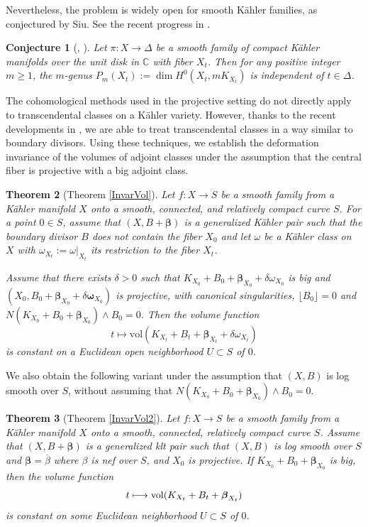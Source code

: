 \documentclass[12pt]{amsart}
\numberwithin{equation}{section}
\newtheorem{theorem} {Theorem} [section]
\theoremstyle{definition}
\theoremstyle{plain}
\newtheorem{conjecture}  [theorem]     {Conjecture}
\newtheorem*{thm A*}{Theorem A}
\newtheorem*{thm B*}{Theorem B}
\newtheorem*{thm C*}{Theorem C}
\newtheorem*{thm D*}{Theorem D}
\theoremstyle{definition}
\renewcommand{\1}{\mathds{1}}
\newcommand{\bbeta}{\boldsymbol{\beta}}
\renewcommand{\>}{\rightarrow}
\begin{document}
Nevertheless, the problem is widely open for smooth K\"ahler families, as conjectured by Siu. See the recent progress in \cite{CP23Pluri}. 
\begin{conjecture}[{\cite[Conjecture 0.4]{Siu02}, \cite[Conjecture 1.4]{CP23Pluri}}]\label{SiuConj}
Let $\pi: X \rightarrow \Delta$ be a smooth family of compact K\"ahler manifolds over the unit disk in $\mathbb{C}$ with fiber $X_t$. Then for any positive integer $m\ge 1$, the $m$-genus $
P_m\left(X_t\right):=\operatorname{dim} H^0\left(X_t, m K_{X_t}\right)
$ is independent of $t\in \Delta$.
\end{conjecture}

The cohomological methods used in the projective setting do not directly apply to transcendental classes on a K\"ahler variety. However, thanks to the recent developments in \cite{DH24MMP,DHY23}, we are able to treat transcendental classes in a way similar to boundary divisors. Using these techniques, we establish the deformation invariance of the volumes of adjoint classes under the assumption that the central fiber is projective with a big adjoint class.
\begin{theorem}[{Theorem \ref{InvarVol}}]\label{0InvarVol}
Let $f: X \to S$ be a smooth family from a K\"ahler manifold $X$ onto a smooth, connected, and relatively compact curve $S$. For a point $0\in S$, assume that $(X,B + \bbeta)$ is a generalized K\"ahler pair such that the boundary divisor $B$ does not contain the fiber $X_0$ and let $\omega$ be a K\"ahler class on $X$ with $\omega_{X_t}:=\omega|_{X_t}$ its restriction to the fiber $X_t$. 

Assume that there exists $\delta>0$ such that $K_{X_0} + B_0 +  \boldsymbol{\beta}_{X_0}+\delta {\omega}_{X_0}$ is big and $(X_0, B_0+  { \boldsymbol{\beta}}_{X_0}+ \delta\boldsymbol{\omega}_{X_0})$ is projective, with canonical singularities, $\lfloor{ B_0\rfloor} = 0$ and $N(K_{X_0 }+B_0 + \bbeta_{X_0})\wedge B_0  = 0$. Then the volume  function 
$$t \longmapsto \mathrm{vol}(K_{X_t}+B_t +  \boldsymbol{\beta}_{X_t} +\delta{\omega}_{X_t})$$ 
is constant on a Euclidean open neighborhood $U \subset S$ of $0$.
\end{theorem}

We also obtain the following variant under the assumption that $(X,B)$ is log smooth over $S$, without assuming that $N(K_{X_0} + B_0 + \bbeta_{X_0})\wedge B_0  = 0$. 
\begin{theorem}[Theorem \ref{InvarVol2}]\label{0InvarVol2}
Let $f:X\to S$ be a smooth family from a K\"ahler manifold $X$ onto a smooth, connected, relatively compact curve $S$. Assume that $(X,B+\bbeta)$ is a generalized klt pair such that $(X,B)$ is log smooth over $S$ and $\bbeta =\overline \beta $ where $\beta$ is nef over $S$, and $X_0$ is projective. If $K_{X_0}+B_0+\bbeta _{X_0}$ is big, then the volume function
\[t\longmapsto {\rm vol}(K_{X_t}+B_t+\bbeta _{X_t})\]
is constant on some Euclidean neighborhood $U\subset S$ of $0$.
\end{theorem}
\end{document}
